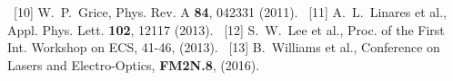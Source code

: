\documentclass[portrait,a0,final]{a0poster}
\newenvironment{poster}{
  \begin{center}
  \begin{minipage}[c]{0.98\textwidth}
}{
  \end{minipage}
  \end{center}
}
\begin{document}
\begin{poster}
\begin{multicols}{2}
{\begin{flushleft}
  ~[10] W.~P.~Grice, Phys. Rev. A \textbf{84}, 042331 (2011).
  \newline %
  ~[11] A.~L.~Linares et al., Appl. Phys. Lett. \textbf{102}, 12117 (2013). %
  \newline 
  ~[12] S.~W.~Lee et al., Proc. of the First Int. Workshop on ECS, 41-46, (2013). %
  \newline 
  ~[13] B.~Williams et al., 
  Conference on Lasers and Electro-Optics, 
  \textbf{FM2N.8}, (2016).
  \end{flushleft}
  } 
\end{multicols}

\end{poster}
\end{document}
